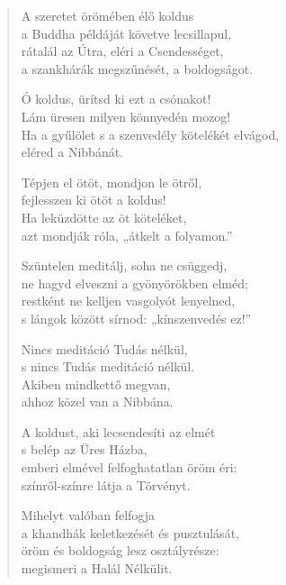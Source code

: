 \begin{verse}
 A szeretet örömében élő koldus\\
a Buddha példáját követve lecsillapul,\\
rátalál az Útra, eléri a Csendességet,\\
a szankhárák megszűnését, a boldogságot.

 Ó koldus, ürítsd ki ezt a csónakot!\\
Lám üresen milyen könnyedén mozog!\\
Ha a gyűlölet s a szenvedély kötelékét elvágod,\\
eléred a Nibbánát.

 Tépjen el ötöt, mondjon le ötről,\\
fejlesszen ki ötöt a koldus!\\
Ha leküzdötte az öt köteléket,\\
azt mondják róla, „átkelt a folyamon.”


 Szüntelen meditálj, soha ne csüggedj,\\
ne hagyd elveszni a gyönyörökben elméd;\\
restként ne kelljen vasgolyót lenyelned,\\
s lángok között sírnod: „kínszenvedés ez!”

 Nincs meditáció Tudás nélkül,\\
s nincs Tudás meditáció nélkül.\\
Akiben mindkettő megvan,\\
ahhoz közel van a Nibbána.

 A koldust, aki lecsendesíti az elmét\\
s belép az Üres Házba,\\
emberi elmével felfoghatatlan öröm éri:\\
színről-színre látja a Törvényt.

 Mihelyt valóban felfogja\\
a khandhák keletkezését és pusztulását,\\
öröm és boldogság lesz osztályrésze:\\
megismeri a Halál Nélkülit.


\end{verse}
